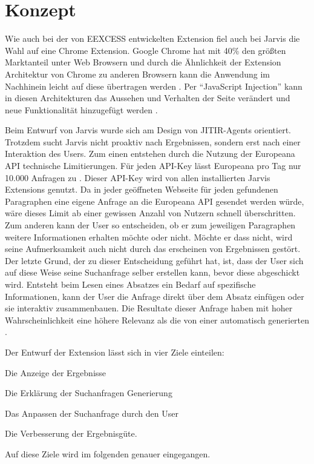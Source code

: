 \section{Konzept}
 Wie auch bei der von EEXCESS entwickelten Extension fiel auch bei Jarvis die Wahl auf eine Chrome Extension. Google Chrome hat mit 40\% den größten Marktanteil unter Web Browsern und durch die Ähnlichkeit der Extension Architektur von Chrome zu anderen Browsern kann die Anwendung im Nachhinein leicht auf diese übertragen werden \cite{schlottererweb}. Per ``JavaScript Injection'' kann in diesen Architekturen das Aussehen und Verhalten der Seite verändert und neue Funktionalität hinzugefügt werden \cite{schlottererweb}.

 Beim Entwurf von Jarvis wurde sich am Design von JITIR-Agents orientiert. Trotzdem sucht Jarvis nicht proaktiv nach Ergebnissen, sondern erst nach einer Interaktion des Users. Zum einen entstehen durch die Nutzung der Europeana API technische Limitierungen. Für jeden API-Key lässt Europeana pro Tag nur 10.000 Anfragen zu \cite{europlimit}. Dieser API-Key wird von allen installierten Jarvis Extensions genutzt. Da in jeder geöffneten Webseite für jeden gefundenen Paragraphen eine eigene Anfrage an die Europeana API gesendet werden würde, wäre dieses Limit ab einer gewissen Anzahl von Nutzern schnell überschritten. Zum anderen kann der User so entscheiden, ob er zum jeweiligen Paragraphen weitere Informationen erhalten möchte oder nicht. Möchte er dass nicht, wird seine Aufmerksamkeit auch nicht durch das erscheinen von Ergebnissen gestört. Der letzte Grund, der zu dieser Entscheidung geführt hat, ist, dass der User sich auf diese Weise seine Suchanfrage selber erstellen kann, bevor diese abgeschickt wird. Entsteht beim Lesen eines Absatzes ein Bedarf auf spezifische Informationen, kann der User die Anfrage direkt über dem Absatz einfügen oder sie interaktiv zusammenbauen. Die Resultate dieser Anfrage haben mit hoher Wahrscheinlichkeit eine höhere Relevanz als die von einer automatisch generierten \cite{rhodes2000just}.

 Der Entwurf der Extension lässt sich in vier Ziele einteilen:
 \begin{enumerate*}
 	\item Die Anzeige der Ergebnisse
  	\item Die Erklärung der Suchanfragen Generierung
 	\item Das Anpassen der Suchanfrage durch den User
 	\item Die Verbesserung der Ergebnisgüte.
\end{enumerate*}
Auf diese Ziele wird im folgenden genauer eingegangen.

